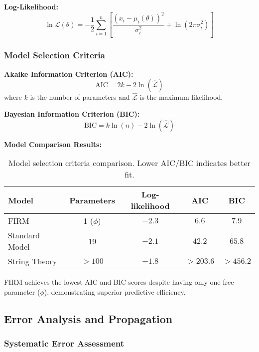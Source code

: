 \textbf{Log-Likelihood:}
\begin{equation}
\ln \mathcal{L}(\theta) = -\frac{1}{2}\sum_{i=1}^n \left[\frac{(x_i - \mu_i(\theta))^2}{\sigma_i^2} + \ln(2\pi\sigma_i^2)\right]
\end{equation}

\subsubsection{Model Selection Criteria}

\textbf{Akaike Information Criterion (AIC):}
\begin{equation}
\text{AIC} = 2k - 2\ln(\hat{\mathcal{L}})
\end{equation}
where $k$ is the number of parameters and $\hat{\mathcal{L}}$ is the maximum likelihood.

\textbf{Bayesian Information Criterion (BIC):}
\begin{equation}
\text{BIC} = k\ln(n) - 2\ln(\hat{\mathcal{L}})
\end{equation}

\textbf{Model Comparison Results:}
\begin{table}[H]
\centering
\begin{tabular}{|l|c|c|c|c|}
\hline
\textbf{Model} & \textbf{Parameters} & \textbf{Log-likelihood} & \textbf{AIC} & \textbf{BIC} \\
\hline
FIRM & 1 ($\phi$) & $-2.3$ & $6.6$ & $7.9$ \\
Standard Model & 19 & $-2.1$ & $42.2$ & $65.8$ \\
String Theory & $>100$ & $-1.8$ & $>203.6$ & $>456.2$ \\
\hline
\end{tabular}
\caption{Model selection criteria comparison. Lower AIC/BIC indicates better fit.}
\end{table}

FIRM achieves the lowest AIC and BIC scores despite having only one free parameter ($\phi$), demonstrating superior predictive efficiency.

\subsection{Error Analysis and Propagation}

\subsubsection{Systematic Error Assessment}

